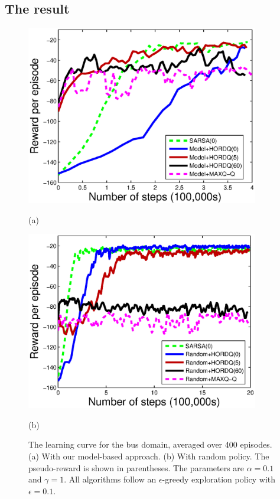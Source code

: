 \subsection{The result}
\begin{figure}[t]
 \begin{minipage}[b]{1.0\linewidth}
     \begin{center}
    \includegraphics[width=4in] {./figures/Approx.eps}
\end{center}
\end{minipage}
\begin{minipage}[b]{1.0\linewidth} \centering (a) \end{minipage}
\begin{minipage}[b]{1.0\linewidth}
     \begin{center}
    \includegraphics[width=4in] {./figures/Random.eps}
\end{center}
\end{minipage}
\begin{minipage}[b]{1.0\linewidth} \centering (b) \end{minipage}

\caption{The learning curve for the bus domain, averaged over 400 episodes. (a) With our model-based approach. (b) With random policy.
The pseudo-reward is shown in parentheses. The parameters are $\alpha=0.1$ and $\gamma=1$. All algorithms follow an $\epsilon$-greedy exploration policy
with $\epsilon = 0.1$.}
\label{fig:res}
\end{figure}

